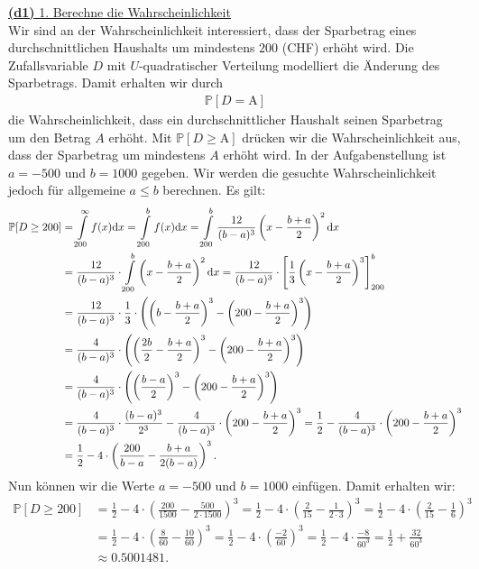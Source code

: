 \underline{\textbf{(d1)} 1. Berechne die Wahrscheinlichkeit}\\
Wir sind an der Wahrscheinlichkeit interessiert, dass der Sparbetrag eines durchschnittlichen Haushalts um mindestens $ 200 $ (CHF) erhöht wird. 
Die Zufallsvariable $ D $ mit $ U $-quadratischer Verteilung modelliert die Änderung des Sparbetrags.
Damit erhalten wir durch 
\begin{align*}
	\mathbb{P}[D=\textrm{A}]
\end{align*}
die Wahrscheinlichkeit, dass ein durchschnittlicher Haushalt seinen Sparbetrag um den Betrag $ A $ erhöht.
Mit $ \mathbb{P}[D\geq \textrm{A}] $ drücken wir die Wahrscheinlichkeit aus, dass der Sparbetrag um mindestens $ A $ erhöht wird.
In der Aufgabenstellung ist $ a = -500  $ und $ b = 1000 $ gegeben. Wir werden die gesuchte Wahrscheinlichkeit jedoch für allgemeine $ a \leq b $ berechnen.
Es gilt:
\begin{align*}
	\mathbb{P}[D \geq 200 ]
	&=
	\int \limits_{200}^\infty f(x) \text{\rmfamily d} x
	=
	\int \limits_{200}^b f(x) \text{\rmfamily d} x
	=
	\int \limits_{200}^b 	\frac{12}{(b-a)^3} \left(x - \frac{b+a}{2}\right)^2\text{\rmfamily d} x\\
	&=
	\frac{12}{(b-a)^3}\cdot \int \limits_{200}^b  \left(x - \frac{b+a}{2}\right)^2\text{\rmfamily d} x
	=
	\frac{12}{(b-a)^3}\cdot
	\left[
	\frac{1}{3}\left(x - \frac{b + a }{2}\right)^3
	\right]_{200}^b\\
	&=
	\frac{12}{(b-a)^3}\cdot \frac{1}{3} \cdot
	\left(
	\left(b - \frac{b + a }{2}\right)^3
	-
	\left(200- \frac{b + a }{2}\right)^3
	\right)\\
	&=
	\frac{4}{(b-a)^3} \cdot
	\left(
	\left(\frac{2b}{2} - \frac{b + a }{2}\right)^3
	-
	\left(200- \frac{b + a }{2}\right)^3
	\right)\\
	&=
	\frac{4}{(b-a)^3} \cdot
	\left(
	\left( \frac{b - a }{2}\right)^3
	-
	\left(200- \frac{b + a }{2}\right)^3
	\right)\\
	&=
	\frac{4}{(b-a)^3} \cdot \frac{(b-a)^3 }{2^3}
	- 
	\frac{4}{(b-a)^3} \cdot \left(200- \frac{b + a }{2}\right)^3
	=
	\frac{1}{2}
	- 
	\frac{4}{(b-a)^3} \cdot \left(200- \frac{b + a }{2}\right)^3\\
	&=
	\frac{1}{2}
	- 
	4 \cdot \left(\frac{200}{b-a}- \frac{b + a }{2(b-a)}\right)^3.
\end{align*}
Nun können wir die Werte $ a = -500  $ und $ b = 1000 $ einfügen. Damit erhalten wir:
\begin{align*}
	\mathbb{P}[D \geq 200 ]
	&=
	\frac{1}{2}
	- 
	4 \cdot \left(\frac{200}{1500}- \frac{500 }{2\cdot 1500}\right)^3
	=
	\frac{1}{2}
	- 
	4 \cdot \left(\frac{2}{15}- \frac{1 }{2\cdot 3}\right)^3
	=
	\frac{1}{2}
	- 
	4 \cdot \left(\frac{2}{15}- \frac{1 }{6}\right)^3\\
	&=
	\frac{1}{2}
	- 
	4 \cdot \left(\frac{8}{60}- \frac{10 }{60}\right)^3
	=
	\frac{1}{2}
	- 
	4 \cdot \left(\frac{-2}{60}\right)^3
	=
	\frac{1}{2}
	- 
	4 \cdot \frac{-8}{60^3}
	=
	\frac{1}{2}
	+
	\frac{32}{60^3}\\
	&\approx
	0.5001481.
\end{align*}
